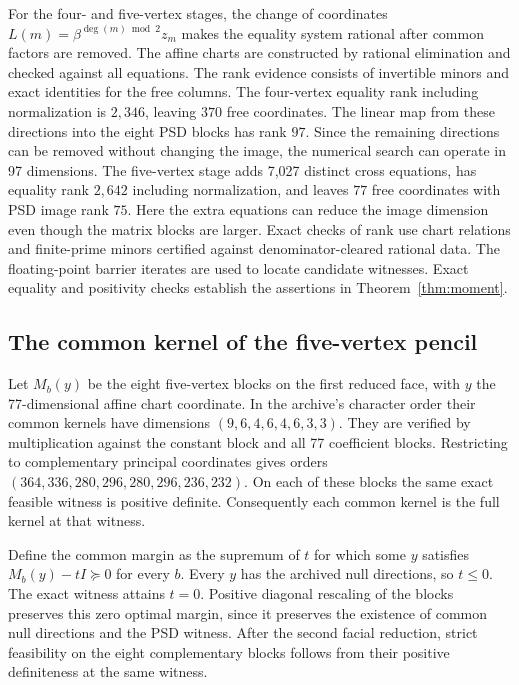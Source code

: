 For the four- and five-vertex stages, the change of coordinates $L(m)=\beta^{\deg(m)\bmod2}z_m$ makes the equality system rational after common factors are removed. The affine charts are constructed by rational elimination and checked against all equations. The rank evidence consists of invertible minors and exact identities for the free columns. The four-vertex equality rank including normalization is $2{,}346$, leaving $370$ free coordinates. The linear map from these directions into the eight PSD blocks has rank $97$. Since the remaining directions can be removed without changing the image, the numerical search can operate in 97 dimensions. The five-vertex stage adds 7{,}027 distinct cross equations, has equality rank $2{,}642$ including normalization, and leaves $77$ free coordinates with PSD image rank $75$. Here the extra equations can reduce the image dimension even though the matrix blocks are larger. Exact checks of rank use chart relations and finite-prime minors certified against denominator-cleared rational data. The floating-point barrier iterates are used to locate candidate witnesses. Exact equality and positivity checks establish the assertions in Theorem~\ref{thm:moment}.

\subsection{The common kernel of the five-vertex pencil}

Let $M_b(y)$ be the eight five-vertex blocks on the first reduced face, with $y$ the 77-dimensional affine chart coordinate. In the archive's character order their common kernels have dimensions $(9,6,4,6,4,6,3,3)$. They are verified by multiplication against the constant block and all 77 coefficient blocks. Restricting to complementary principal coordinates gives orders $(364,336,280,296,280,296,236,232)$. On each of these blocks the same exact feasible witness is positive definite. Consequently each common kernel is the full kernel at that witness.

Define the common margin as the supremum of $t$ for which some $y$ satisfies $M_b(y)-tI\succeq0$ for every $b$. Every $y$ has the archived null directions, so $t\le0$. The exact witness attains $t=0$. Positive diagonal rescaling of the blocks preserves this zero optimal margin, since it preserves the existence of common null directions and the PSD witness. After the second facial reduction, strict feasibility on the eight complementary blocks follows from their positive definiteness at the same witness.

